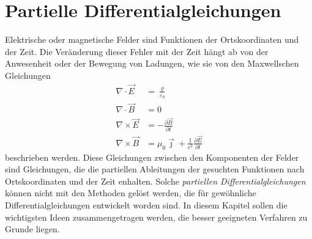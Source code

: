 %
%
%
\chapter{Partielle Differentialgleichungen\label{chapter:pde}}
\rhead{}
Elektrische oder magnetische Felder sind Funktionen der Ortskoordinaten
und der Zeit.
Die Veränderung dieser Fehler mit der Zeit hängt ab von der Anwesenheit
oder der Bewegung von Ladungen, wie sie von den Maxwellschen Gleichungen
\begin{align*}
\nabla\cdot\vec{E} &= \frac{\varrho}{\varepsilon_0}
\\
\nabla\cdot\vec{B} &= 0
\\
\nabla\times\vec{E} &= -\frac{\partial\vec{B}}{\partial t}
\\
\nabla\times\vec{B} &= \mu_0\vec{\jmath}
	+ \frac{1}{c^2}\frac{\partial\vec{E}}{\partial t}
\end{align*}
beschrieben werden.
Diese Gleichungen zwischen den Komponenten der Felder sind Gleichungen,
die die partiellen Ableitungen der gesuchten Funktionen nach Ortskoordinaten
und der Zeit enhalten.
Solche {\em partiellen Differentialgleichungen} können nicht mit den Methoden
gelöst werden, die für gewöhnliche Differentialgleichungen entwickelt 
worden sind.
In diesem Kapitel sollen die wichtigsten Ideen zusammengetragen werden,
die besser geeigneten Verfahren zu Grunde liegen.






